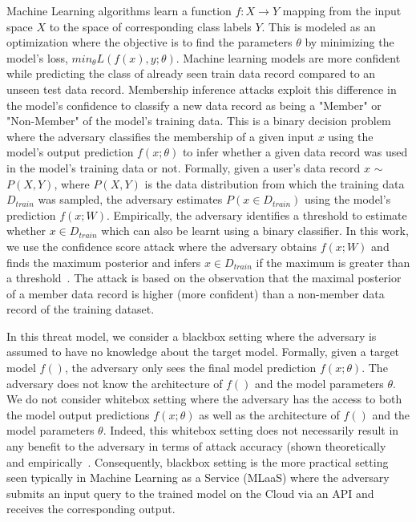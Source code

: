 Machine Learning algorithms learn a function $f:X \rightarrow Y$ mapping from the input space $X$ to the space of corresponding class labels $Y$.
This is modeled as an optimization where the objective is to find the parameters $\theta$ by minimizing the model's loss, $min_{\theta} L(f(x),y;\theta)$.
Machine learning models are more confident while predicting the class of already seen train data record compared to an unseen test data record.
Membership inference attacks exploit this difference in the model's confidence to classify a new data record as being a "Member" or "Non-Member" of the model's training data.
This is a binary decision problem where the adversary classifies the membership of a given input $x$ using the model's output prediction $f(x;\theta)$ to infer whether a given data record was used in the model's training data or not.
Formally, given a user's data record $x$ $\sim$ $P(X,Y)$, where $P(X,Y)$ is the data distribution from which the training data $D_{train}$ was sampled, the adversary estimates $P(x \in D_{train})$ using the model's prediction $f(x;W)$.
Empirically, the adversary identifies a threshold to estimate whether $x \in D_{train}$ which can also be learnt using a binary classifier.
In this work, we use the confidence score attack where the adversary obtains $f(x;W)$ and finds the maximum posterior and infers $x \in D_{train}$ if the maximum is greater than a threshold~\cite{salem2018ml,8429311}.
The attack is based on the observation that the maximal posterior of a member data record is higher (more confident) than a non-member data record of the training dataset.


In this threat model, we consider a blackbox setting where the adversary is assumed to have no knowledge about the target model.
Formally, given a target model $f()$, the adversary only sees the final model prediction $f(x;\theta)$.
The adversary does not know the architecture of $f()$ and the model parameters $\theta$.
We do not consider whitebox setting where the adversary has the access to both the model output predictions $f(x;\theta)$ as well as the architecture of $f()$ and the model parameters $\theta$.
Indeed, this whitebox setting does not necessarily result in any benefit to the adversary in terms of attack accuracy (shown theoretically~\cite{pmlr-v97-sablayrolles19a} and empirically~\cite{DBLP:journals/corr/abs-1906-06589, song2020systematic}.
Consequently, blackbox setting is the more practical setting seen typically in Machine Learning as a Service (MLaaS) where the adversary submits an input query to the trained model on the Cloud via an API and receives the corresponding output.











